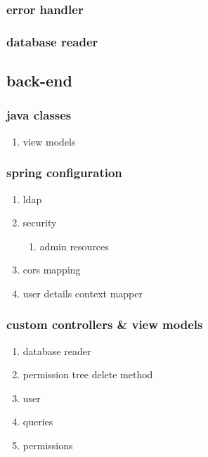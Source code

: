 \documentclass[11pt]{article}
\begin{document}
\subsubsection{error handler}
\label{sec:orge39d5cb}
\subsubsection{database reader}
\label{sec:org1f549d3}

\subsection{back-end}
\label{sec:org9907160}
\subsubsection{java classes}
\label{sec:orgc2abe98}
\begin{enumerate}
\item view models
\label{sec:org7cb36f5}
\end{enumerate}
\subsubsection{spring configuration}
\label{sec:org9af8b2c}
\begin{enumerate}
\item ldap
\label{sec:org3a566c0}
\item security
\label{sec:org9aabd55}
\begin{enumerate}
\item admin resources
\label{sec:org936057a}
\end{enumerate}
\item cors mapping
\label{sec:org7803d3d}
\item user details context mapper
\label{sec:org18c961a}
\end{enumerate}
\subsubsection{custom controllers \& view models}
\label{sec:orgd8042bc}
\begin{enumerate}
\item database reader
\label{sec:orge359031}
\item permission tree delete method
\label{sec:orgefebf83}
\item user
\label{sec:orgb1f7b6a}
\item queries
\label{sec:org4d257cd}
\item permissions
\label{sec:orgd8e0e50}
\end{enumerate}
\end{document}
